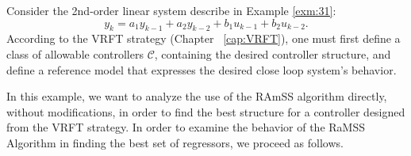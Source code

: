 \begin{exmp}\label{ex:sis2aord}

  Consider the 2nd-order linear system describe in Example \ref{exm:31}: 
  \begin{equation}
    \label{eq:sis2aord}
    y_k = a_1y_{k-1} + a_2y_{k-2} + b_1u_{k-1} + b_2u_{k-2}.
  \end{equation}
  According to the VRFT strategy (Chapter ~\ref{cap:VRFT}), one must first define a class of allowable controllers $\mathscr{C}$, containing the desired controller structure, and define a reference model that expresses the desired close loop system's behavior.

  In this example, we want to analyze the use of the RAmSS algorithm directly, without modifications, in order to find the best structure for a controller designed from the VRFT strategy.
  In order to examine the behavior of the RaMSS Algorithm in finding the best set of regressors, we proceed as follows.


\end{exmp}
